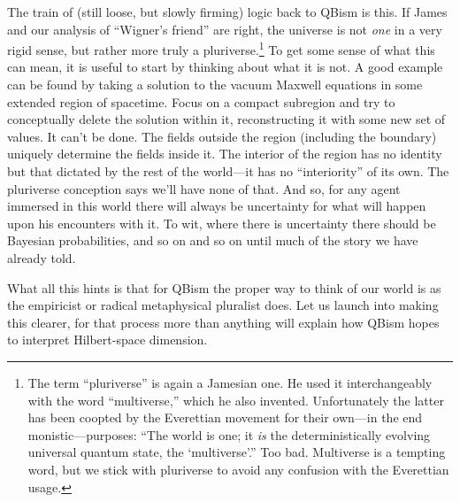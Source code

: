The train of (still loose, but slowly firming) logic back to QBism is this.  If James and our analysis of ``Wigner's friend'' are right, the universe is not {\it one\/} in a very rigid sense, but rather more truly a pluriverse.\footnote{The term ``pluriverse'' is again a Jamesian one.  He used it interchangeably with the word ``multiverse,'' which he also invented.  Unfortunately the latter has been coopted by the Everettian movement for their own---in the end monistic---purposes:  ``The world is one; it {\it is\/} the deterministically evolving universal quantum state, the `multiverse'.'' Too bad.  Multiverse is a tempting word, but we stick with pluriverse to avoid any confusion with the Everettian usage.}  To get some sense of what this can mean, it is useful to start by thinking about what it is not.  A good example can be found by taking a solution to the vacuum Maxwell equations in some extended region of spacetime.  Focus on a compact subregion and try to conceptually delete the solution within it, reconstructing it with some new set of values.  It can't be done.  The fields outside the region (including the boundary) uniquely determine the fields inside it.  The interior of the region has no identity but that dictated by the rest of the world---it has no ``interiority'' of its own.  The pluriverse conception says we'll have none of that.  And so, for any agent immersed in this world there will always be uncertainty for what will happen upon his encounters with it.  To wit, where there is uncertainty there should be Bayesian probabilities, and so on and so on until much of the story we have already told.

What all this hints is that for QBism the proper way to think of our world is as the empiricist or radical metaphysical pluralist does.  Let us launch into making this clearer, for that process more than anything will explain how QBism hopes to interpret Hilbert-space dimension.

